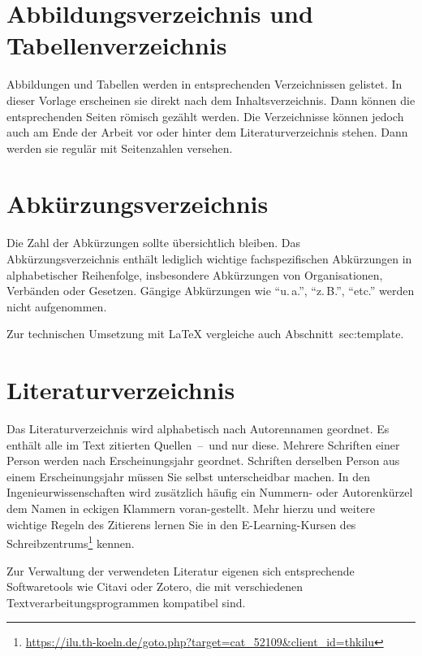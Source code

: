 \section{Abbildungsverzeichnis und Tabellenverzeichnis}
Abbildungen und Tabellen werden in entsprechenden Verzeichnissen gelistet. In dieser Vorlage erscheinen sie direkt nach dem Inhaltsverzeichnis. Dann können die entsprechenden Seiten römisch gezählt werden. Die Verzeichnisse können jedoch auch am Ende der Arbeit vor oder hinter dem Literaturverzeichnis stehen. Dann werden sie regulär mit Seitenzahlen versehen.
%
%
\section{Abkürzungsverzeichnis}
Die Zahl der Abkürzungen sollte übersichtlich bleiben. Das Abkürzungsverzeichnis enthält lediglich wichtige fachspezifischen Abkürzungen in alphabetischer Reihenfolge, insbesondere Abkürzungen von Organisationen, Verbänden oder Gesetzen. Gängige Abkürzungen wie \enquote{u.\,a.}, \enquote{z.\,B.}, \enquote{etc.} werden nicht aufgenommen.
\par
Zur technischen Umsetzung mit \LaTeX{} vergleiche auch Abschnitt~sec:template.
%
%
\section{Literaturverzeichnis}
Das Literaturverzeichnis wird alphabetisch nach Autorennamen geordnet. Es enthält alle im Text zitierten Quellen~--~und nur diese. Mehrere Schriften einer Person werden nach Erscheinungsjahr geordnet. Schriften derselben Person aus einem Erscheinungsjahr müssen Sie selbst unterscheidbar machen. In den Ingenieurwissenschaften wird zusätzlich häufig ein Nummern- oder Autorenkürzel dem Namen in eckigen Klammern voran-gestellt. Mehr hierzu und weitere wichtige Regeln des Zitierens lernen Sie in den E-Learning-Kursen des Schreibzentrums\footnote{\href{https://ilu.th-koeln.de/goto.php?target=cat\_52109\&client\_id=thkilu}{https://ilu.th-koeln.de/goto.php?target=cat\_52109\&client\_id=thkilu}} kennen.
\par
Zur Verwaltung der verwendeten Literatur eigenen sich entsprechende Softwaretools wie Citavi oder Zotero, die mit verschiedenen Textverarbeitungsprogrammen kompatibel sind.
%
%

